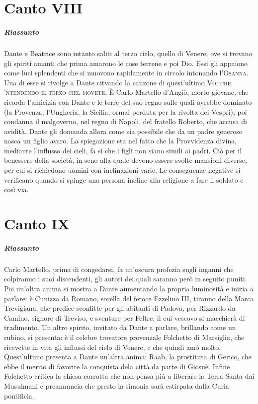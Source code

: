 \documentclass[a4paper, twoside, titlepage]{book}
\newcommand{\titolo}[1]{\textsc{#1}}
\newcounter{mar}
\begin{document}
\chapter{Canto VIII}

\paragraph{Riassunto}  Dante e Beatrice sono intanto saliti al terzo cielo, quello di Venere, ove si trovano gli spiriti amanti che prima amarono le cose terrene e poi Dio. Essi gli appaiono come luci splendenti che si muovono rapidamente in circolo intonando l'\titolo{Osanna}. Una di esse si rivolge a Dante citvando la canzone di quest'ultimo \titolo{Voi che 'ntendendo il terzo ciel movete}. È Carlo Martello d'Angiò, morto giovane, che ricorda l'amicizia con Dante e le terre del suo regno sulle quali avrebbe dominato (la Provenza, l'Ungheria, la Sicilia, ormai perduta per la rivolta dei Vespri); poi condanna il malgoverno, nel regno di Napoli, del fratello Roberto, che accusa di avidità. Dante gli domanda allora come sia possibile che da un padre generoso nasca un figlio avaro. La spiegazione sta nel fatto che la Provvidenza divina, mediante l'influsso dei cieli, fa sì che i figli non siano simili ai padri. Ciò per il benessere della società, in seno alla quale devono essere svolte mansioni diverse, per cui si richiedono uomini con inclinazioni varie. Le conseguenze negative si verificano quando si spinge una persona incline alla religione a fare il soldato e così via.

\chapter{Canto IX}

\paragraph{Riassunto} Carlo Martello, prima di congedarsi, fa un'oscura profezia sugli inganni che colpiranno i suoi discendenti, gli autori dei quali saranno però in seguito puniti. Poi un'altra anima si mostra a Dante aumentando la propria luminosità e inizia a parlare: è Cunizza da Romano, sorella del feroce Ezzelino III, tiranno della Marca Trevigiana, che predice sconfitte per gli abitanti di Padova, per Rizzardo da Camino, signore di Treviso, e sventure per Feltre, il cui vescovo si macchierà di tradimento. Un altro spirito, invitato da Dante a parlare, brillando come un rubino, si presenta: è il celebre trovatore provenzale Folchetto di Marsiglia, che ricevette in vita gli influssi del cielo di Venere, e che quindi amò molto. Quest'ultimo presenta a Dante un'altra anima: Raab, la prostituta di Gerico, che ebbe il merito di favorire la conquista dela città da parte di Giosuè. Infine Folchetto critica la chiesa corrotta che non pensa più a liberare la Terra Santa dai Musulmani e preannuncia che presto la simonia sarà estirpata dalla Curia pontificia.
\end{document}
